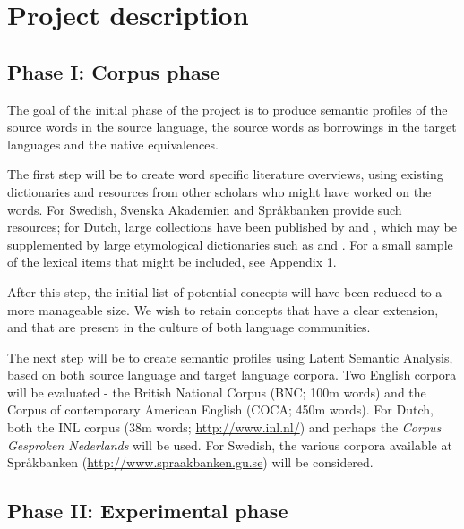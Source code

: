 \documentclass[a4paper]{article}
\begin{document}








\section{Project description}



\subsection{Phase I: Corpus phase}
\label{sect_corpus}

The goal of the initial phase of the project is to produce semantic profiles of the source words in the source language, the source words as borrowings in the target languages and the native equivalences. 

The first step will be to create word specific literature overviews, using existing dictionaries and resources from other scholars who might have worked on the words. For Swedish, Svenska Akademien \citep{Akademien2012} and Spr\aa kbanken \citep{Universitet2012} provide such resources; for Dutch, large collections have been published by \cite{Koops2009} and \cite{Braamkolk2005}, which may be supplemented by large etymological dictionaries such as \citet{Sijs2001} and \citet{Sijs2005}.
For a small sample of the lexical items that might be included, see Appendix 1.

After this step, the initial list of potential concepts will have been reduced to a more manageable size. We wish to retain concepts that have a clear extension, and that are present in the culture of both language communities.

The next step will be to create semantic profiles using Latent Semantic Analysis, based on both source language and target language corpora. 
Two English corpora will be evaluated - the British National Corpus (BNC; 100m words) and the Corpus of contemporary American English (COCA; 450m words). 
For Dutch, both the INL corpus (38m words; \url{http://www.inl.nl/}) and perhaps the \textit{Corpus Gesproken Nederlands} \citep[Corpus of Spoken Dutch; 10m words;][]{Oostdijk2003} will be used. 
For Swedish, the various corpora available at Spr\aa kbanken (\url{http://www.spraakbanken.gu.se}) will be considered.


\subsection{Phase II: Experimental phase}
\end{document}
